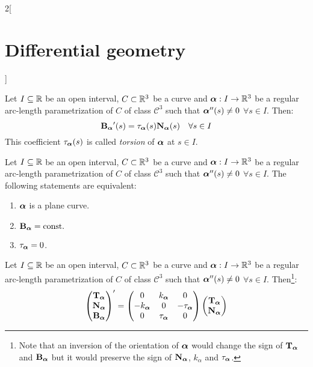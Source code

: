 \documentclass[../../../main_math.tex]{subfiles}
\begin{document}
\begin{multicols}{2}[\section{Differential geometry}]
  \begin{proposition}
    Let $I\subseteq\RR$ be an open interval, $C\subset\RR^3$ be a curve and $\vf{\alpha}:I\rightarrow\RR^3$ be a regular arc-length parametrization of $C$ of class $\mathcal{C}^3$ such that $\vf{\alpha}''(s)\ne 0$ $\forall s\in I$. Then: $$\B\alpha'(s)=\ta\alpha(s)\N\alpha(s)\quad\forall s\in I$$ This coefficient $\ta\alpha(s)$ is called \emph{torsion} of $\vf{\alpha}$ at $s\in I$.
  \end{proposition}
  \begin{proposition}
    Let $I\subseteq\RR$ be an open interval, $C\subset\RR^3$ be a curve and $\vf{\alpha}:I\rightarrow\RR^3$ be a regular arc-length parametrization of $C$ of class $\mathcal{C}^3$ such that $\vf{\alpha}''(s)\ne 0$ $\forall s\in I$. The following statements are equivalent:
    \begin{enumerate}
      \item $\vf{\alpha}$ is a plane curve.
      \item $\B\alpha=\const$
      \item $\ta\alpha=0$.
    \end{enumerate}
  \end{proposition}
  \begin{theorem}
    Let $I\subseteq\RR$ be an open interval, $C\subset\RR^3$ be a curve and $\vf{\alpha}:I\rightarrow\RR^3$ be a regular arc-length parametrization of $C$ of class $\mathcal{C}^3$ such that $\vf{\alpha}''(s)\ne 0$ $\forall s\in I$. Then\footnote{Note that an inversion of the orientation of $\vf\alpha$ would change the sign of $\T\alpha$ and $\B\alpha$ but it would preserve the sign of $\N\alpha$, $k_{\alpha}$ and $\ta\alpha$.}:
    $$
      \begin{pmatrix}
        \T\alpha \\
        \N\alpha \\
        \B\alpha \\
      \end{pmatrix}'=
      \begin{pmatrix}
        0              & k_{\vf\alpha} & 0          \\
        -k_{\vf\alpha} & 0             & -\ta\alpha \\
        0              & \ta\alpha     & 0
      \end{pmatrix}
      \begin{pmatrix}
        \T\alpha \\
        \N\alpha \\

\end{pmatrix}$$
\end{theorem}
\end{multicols}
\end{document}
